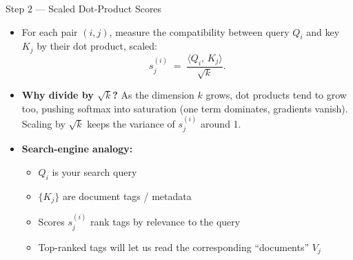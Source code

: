 \begin{frame}{Step 2 --- Scaled Dot-Product Scores}
\begin{itemize}
\item For each pair $(i, j)$, measure the compatibility between query $Q_i$ and key $K_j$ by their dot product, scaled:
\[
   s_{j}^{(i)} \;=\; \frac{\langle Q_{i},\, K_{j} \rangle}{\sqrt{k}}.
\]

\medskip
\item \textbf{Why divide by $\sqrt{k}$?} As the dimension $k$ grows, dot products tend to grow too, pushing softmax into saturation (one term dominates, gradients vanish). Scaling by $\sqrt{k}$ keeps the variance of $s_{j}^{(i)}$ around 1.

\medskip
\item \textbf{Search-engine analogy:}
\begin{itemize}
    \item $Q_i$ is your search query
    \item $\{K_j\}$ are document tags / metadata
    \item Scores $s_j^{(i)}$ rank tags by relevance to the query
    \item Top-ranked tags will let us read the corresponding ``documents'' $V_j$
\end{itemize}
\end{itemize}
\end{frame}

